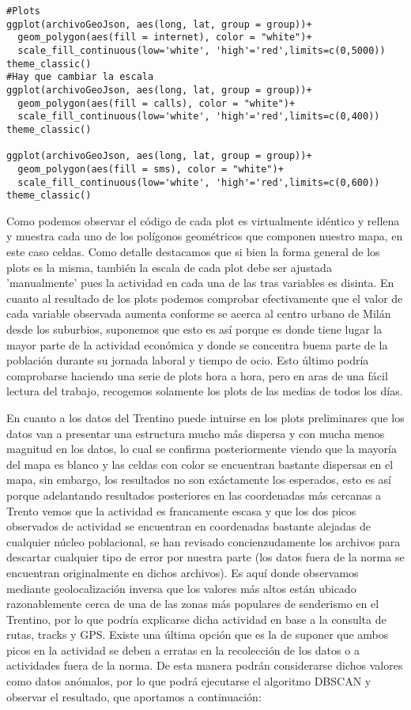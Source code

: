 \documentclass[11pt, a4paper]{article} %
\begin{document}
\begin{lstlisting}
#Plots
ggplot(archivoGeoJson, aes(long, lat, group = group))+
  geom_polygon(aes(fill = internet), color = "white")+
  scale_fill_continuous(low='white', 'high'='red',limits=c(0,5000))
theme_classic()
#Hay que cambiar la escala
ggplot(archivoGeoJson, aes(long, lat, group = group))+
  geom_polygon(aes(fill = calls), color = "white")+
  scale_fill_continuous(low='white', 'high'='red',limits=c(0,400))
theme_classic()

ggplot(archivoGeoJson, aes(long, lat, group = group))+
  geom_polygon(aes(fill = sms), color = "white")+
  scale_fill_continuous(low='white', 'high'='red',limits=c(0,600))
theme_classic()
\end{lstlisting}
Como podemos observar el código de cada plot es virtualmente idéntico y rellena y muestra cada uno de los polígonos geométricos que componen nuestro mapa, en este caso celdas. Como detalle destacamos que si bien la forma general de los plots es la misma, también la escala de cada plot debe ser ajustada 'manualmente' pues la actividad en cada una de las tras variables es disinta. En cuanto al resultado de los plots podemos comprobar efectivamente que el valor de cada variable observada aumenta conforme se acerca al centro urbano de Milán desde los suburbios, suponemos que esto es así porque es donde tiene lugar la mayor parte de la actividad económica y donde se concentra buena parte de la población durante su jornada laboral y tiempo de ocio. Esto último podría comprobarse haciendo una serie de plots hora a hora, pero en aras de una fácil lectura del trabajo, recogemos solamente los plots de las medias de todos los días.

En cuanto a los datos del Trentino puede intuirse en los plots preliminares que los datos van a presentar una estructura mucho más dispersa y con mucha menos magnitud en los datos, lo cual se confirma posteriormente viendo que la mayoría del mapa es blanco y las celdas con color se encuentran bastante dispersas en el mapa, sin embargo, los resultados no son exáctamente los esperados, esto es así porque adelantando resultados posteriores en las coordenadas más cercanas a Trento vemos que la actividad es francamente escasa y que los dos picos observados de actividad se encuentran en coordenadas bastante alejadas de cualquier núcleo poblacional, se han revisado concienzudamente los archivos para descartar cualquier tipo de error por nuestra parte (los datos fuera de la norma se encuentran originalmente en dichos archivos). Es aquí donde observamos mediante geolocalización inversa que los valores más altos están ubicado razonablemente cerca de una de las zonas más populares de senderismo en el Trentino, por lo que podría explicarse dicha actividad en base a la consulta de rutas, tracks y GPS. Existe una última opción que es la de suponer que ambos picos en la actividad se deben a erratas en la recolección de los datos o a actividades fuera de la norma. De esta manera podrán considerarse dichos valores como datos anómalos, por lo que podrá ejecutarse el algoritmo DBSCAN y observar el resultado, que aportamos a continuación:
\end{document}
